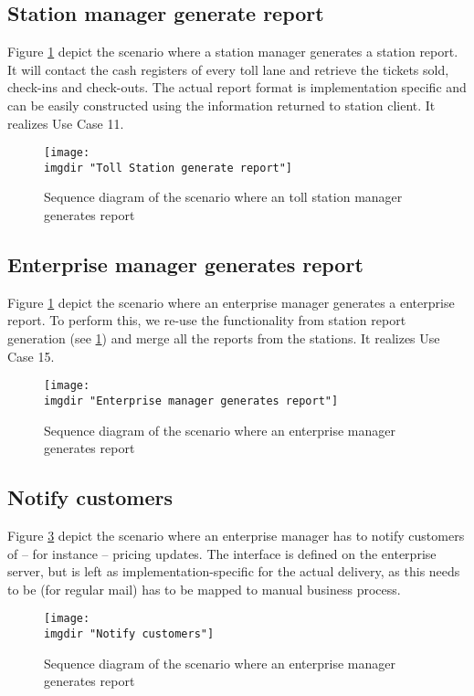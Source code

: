 \subsection{Station manager generate report}
Figure \ref{fig:seq_diag:station_manager_generate_report} depict the scenario where a station manager generates a station report. It will contact the cash registers of every toll lane and retrieve the tickets sold, check-ins and check-outs. The actual report format is implementation specific and can be easily constructed using the information returned to station client. It realizes Use Case 11.
\begin{figure} %
  \texttt{[image: \\imgdir "Toll Station generate report"]}
  \caption{Sequence diagram of the scenario where an toll station manager generates report}
  \label{fig:seq_diag:station_manager_generate_report}
\end{figure}

\subsection{Enterprise manager generates report}
Figure \ref{fig:seq_diag:station_manager_generate_report} depict the scenario where an enterprise manager generates a enterprise report. To perform this, we re-use the functionality from station report generation (see \ref{fig:seq_diag:station_manager_generate_report}) and merge all the reports from the stations. It realizes Use Case 15.
\begin{figure}%
  \texttt{[image: \\imgdir "Enterprise manager generates report"]}
  \caption{Sequence diagram of the scenario where an enterprise manager generates report}
  \label{fig:seq_diag:enterprise_manager_generate_report}
\end{figure}

\subsection{Notify customers}
Figure \ref{fig:seq_diag:notify_customers} depict the scenario where an enterprise manager has to notify customers of -- for instance -- pricing updates. The interface is defined on the enterprise server, but is left as implementation-specific for the actual delivery,  as this needs to be (for regular mail) has to be mapped to manual business process.
\begin{figure}%
  \texttt{[image: \\imgdir "Notify customers"]}
  \caption{Sequence diagram of the scenario where an enterprise manager generates report}
  \label{fig:seq_diag:notify_customers}
\end{figure}

